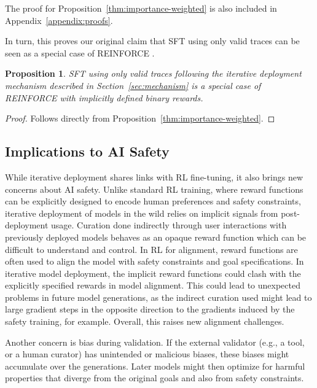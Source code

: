 \documentclass{article}
\newtheorem{proposition}{Proposition}
\renewcommand{\cite}[1]{\citep[][]{#1}}
\begin{document}
The proof for Proposition~\ref{thm:importance-weighted} is also included in
Appendix~\ref{appendix:proofs}.

In turn, this proves our original claim that SFT
using only valid traces can be seen as a special case of REINFORCE
\cite{williams-jml1992}.

\begin{proposition}
SFT using only valid traces following the iterative deployment mechanism described in Section~\ref{sec:mechanism} is a special case of REINFORCE with implicitly defined binary rewards.
\label{thm:main-result}
\end{proposition}

\begin{proof}
Follows directly from Proposition~\ref{thm:importance-weighted}.
\end{proof}




\subsection{Implications to AI Safety}

While iterative deployment shares links with RL fine-tuning, it also brings
new concerns about AI safety. Unlike standard RL training, where reward functions can be explicitly
designed to encode human preferences and safety constraints, iterative
deployment of models in the wild relies on implicit signals from post-deployment usage. Curation done indirectly through user interactions with previously deployed models behaves as an opaque reward
function which can be difficult to understand and control.
In RL
for alignment, reward functions are often used to align the model with safety
constraints and goal specifications. In iterative model deployment, the implicit reward
functions could clash with the explicitly specified rewards in
model alignment. This could lead to unexpected problems in future model
generations, as the indirect curation used might lead to large gradient steps in the opposite direction to the gradients induced by the safety training, for example.
Overall, this raises new alignment challenges.


Another concern is bias during validation. If the external validator (e.g., a tool,
or a human curator) has unintended or malicious biases, these biases might
accumulate over the generations. Later models might then optimize for harmful
properties that diverge from the original goals and also from safety
constraints.
\end{document}
